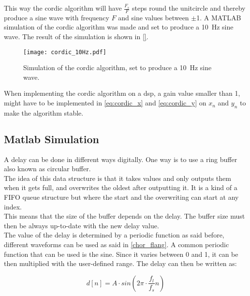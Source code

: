This way the \gls{cordic} algorithm will have $\frac{F_s}{F}$ steps round the unitcircle and thereby produce a sine wave with frequency $F$ and sine values between $\pm$1.
A MATLAB simulation of the \gls{cordic} algorithm was made and set to produce a \SI{10}{\hertz} sine wave. The result of the simulation is shown in \autoref{}.

\begin{figure}[!h]
    \centering
        \texttt{[image: cordic\_10Hz.pdf]}
        \caption{Simulation of the \gls{cordic} algorithm, set to produce a \SI{10}{\hertz} sine wave.}
        \label{fig:cordic_10Hz}
  \end{figure}
  
When implementing the \gls{cordic} algorithm on a \gls{dsp}, a gain value smaller than 1, might have to be implemented in \autoref{eq:cordic_x} and \autoref{eq:cordic_y} on $x_n$ and $y_n$ to make the algorithm stable. 







\subsection{Matlab Simulation}

A delay can be done in different ways digitally. One way is to use a ring buffer also known as circular buffer. \\
The idea of this data structure is that it takes values and only outputs them when it gets full, and overwrites the oldest after outputting it. It is a kind of a FIFO queue structure but where the start and the overwriting can start at any index. \\
This means that the size of the buffer depends on the delay.  The buffer size must then be always up-to-date with the new delay value. \\ 
The value of the delay is determined by a periodic function as said before, different waveforms can be used as said in \autoref{chor_flang}. A common periodic function that can be used is the sine. Since it varies between 0 and 1, it can be then multiplied with the user-defined range. 
The delay can then be written as:

\begin{equation}
	d[n]= A \cdot sin(2\pi  \cdot \frac{f_{l}}{f_{s}} n)
\end{equation}

\startexplain
    \stopexplain 

